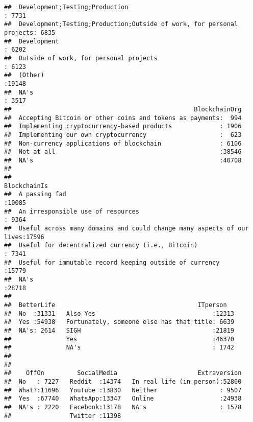 \documentclass[]{article}
\begin{document}
\begin{verbatim}
##  Development;Testing;Production                                       : 7731  
##  Development;Testing;Production;Outside of work, for personal projects: 6835  
##  Development                                                          : 6202  
##  Outside of work, for personal projects                               : 6123  
##  (Other)                                                              :19148  
##  NA's                                                                 : 3517  
##                                                  BlockchainOrg  
##  Accepting Bitcoin or other coins and tokens as payments:  994  
##  Implementing cryptocurrency-based products             : 1906  
##  Implementing our own cryptocurrency                    :  623  
##  Non-currency applications of blockchain                : 6106  
##  Not at all                                             :38546  
##  NA's                                                   :40708  
##                                                                 
##                                                                 BlockchainIs  
##  A passing fad                                                        :10085  
##  An irresponsible use of resources                                    : 9364  
##  Useful across many domains and could change many aspects of our lives:17596  
##  Useful for decentralized currency (i.e., Bitcoin)                    : 7341  
##  Useful for immutable record keeping outside of currency              :15779  
##  NA's                                                                 :28718  
##                                                                               
##  BetterLife                                       ITperson    
##  No  :31331   Also Yes                                :12313  
##  Yes :54938   Fortunately, someone else has that title: 6639  
##  NA's: 2614   SIGH                                    :21819  
##               Yes                                     :46370  
##               NA's                                    : 1742  
##                                                               
##                                                               
##    OffOn         SocialMedia                      Extraversion  
##  No   : 7227   Reddit  :14374   In real life (in person):52860  
##  What?:11696   YouTube :13830   Neither                 : 9507  
##  Yes  :67740   WhatsApp:13347   Online                  :24938  
##  NA's : 2220   Facebook:13178   NA's                    : 1578  
##                Twitter :11398                                   

\end{verbatim}
\end{document}
